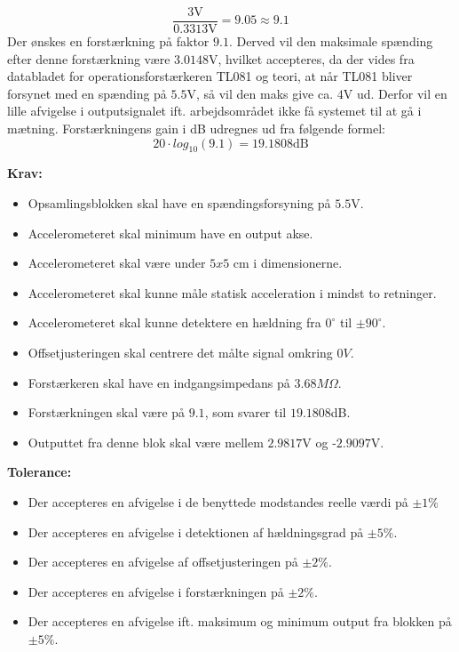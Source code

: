 \begin{equation}
\dfrac{3\text{V}}{0.3313\text{V}} =  9.05 \approx 9.1
\end{equation}
\noindent Der ønskes en forstærkning på faktor $9.1$. Derved vil den maksimale spænding efter denne forstærkning være $3.0148$V, hvilket accepteres, da der vides fra databladet for operationsforstærkeren TL081 og teori, at når TL081 bliver forsynet med en spænding på $5.5$V, så vil den maks give ca. $4$V ud. \cite{Corporation1995} Derfor vil en lille afvigelse i outputsignalet ift. arbejdsområdet ikke få systemet til at gå i mætning. Forstærkningens gain i dB udregnes ud fra følgende formel: 
\begin{equation}
20 \cdot log_{10} (9.1) = 19.1808\text{dB}
\end{equation} 

\noindent\textbf{Krav:}
\begin{itemize}
	\item Opsamlingsblokken skal have en spændingsforsyning på $5.5$V.
	\item Accelerometeret skal minimum have en output akse.%
	\item Accelerometeret skal være under $5x5$ cm i dimensionerne.%
	\item Accelerometeret skal kunne måle statisk acceleration i mindst to retninger.
	\item Accelerometeret skal kunne detektere en hældning fra $0^{\circ}$ til $\pm90^{\circ}$.
	\item Offsetjusteringen skal centrere det målte signal omkring $0V$.
	\item Forstærkeren skal have en indgangsimpedans på $3.68M\Omega$.
	\item Forstærkningen skal være på $9.1$, som svarer til $19.1808$dB.
	\item Outputtet fra denne blok skal være mellem $2.9817$V og -$2.9097$V.
\end{itemize}
\textbf{Tolerance:}
\begin{itemize}
	\item Der accepteres en afvigelse i de benyttede modstandes reelle værdi på $\pm1\%$
	\item Der accepteres en afvigelse i detektionen af hældningsgrad på $\pm5\%$.
	\item Der accepteres en afvigelse af offsetjusteringen på $\pm2\%$.
	\item Der accepteres en afvigelse i forstærkningen på $\pm2\%$.
	\item Der accepteres en afvigelse ift. maksimum og minimum output fra blokken på $\pm5\%$.
\end{itemize}
